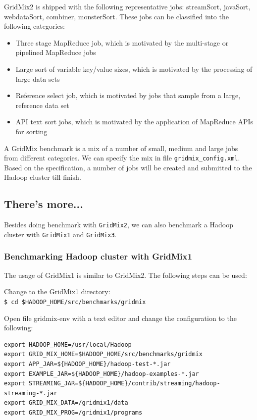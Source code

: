 GridMix2 is shipped with the following representative jobs: streamSort, javaSort, webdataSort, combiner, monsterSort. These jobs can be classified into the following categories:
\begin{itemize}
  \item Three stage MapReduce job, which is motivated by the multi-stage or pipelined MapReduce jobs
  \item Large sort of variable key/value sizes, which is motivated by the processing of large data sets
  \item Reference select job, which is motivated by jobs that sample from a large, reference data set
  \item API text sort jobs, which is motivated by the application of MapReduce APIs for sorting
\end{itemize}
A GridMix benchmark is a mix of a number of small, medium and large jobs from different categories. We can specify the mix in file \verb|gridmix_config.xml|. Based on the specification, a number of jobs will be created and submitted to the Hadoop cluster till finish.
\subsection*{There's more...}
Besides doing benchmark with \verb|GridMix2|, we can also benchmark a Hadoop cluster with \verb|GridMix1| and \verb|GridMix3|.

\subsubsection*{Benchmarking Hadoop cluster with GridMix1}
The usage of GridMix1 is similar to GridMix2. The following steps can be used:

Change to the GridMix1 directory: \\
\verb|$ cd $HADOOP_HOME/src/benchmarks/gridmix|

Open file gridmix-env with a text editor and change the configuration to the following:
\lstset{style=bashstyle}
\begin{lstlisting}
export HADOOP_HOME=/usr/local/Hadoop
export GRID_MIX_HOME=$HADOOP_HOME/src/benchmarks/gridmix
export APP_JAR=${HADOOP_HOME}/hadoop-test-*.jar
export EXAMPLE_JAR=${HADOOP_HOME}/hadoop-examples-*.jar
export STREAMING_JAR=${HADOOP_HOME}/contrib/streaming/hadoop-streaming-*.jar
export GRID_MIX_DATA=/gridmix1/data
export GRID_MIX_PROG=/gridmix1/programs
\end{lstlisting}

